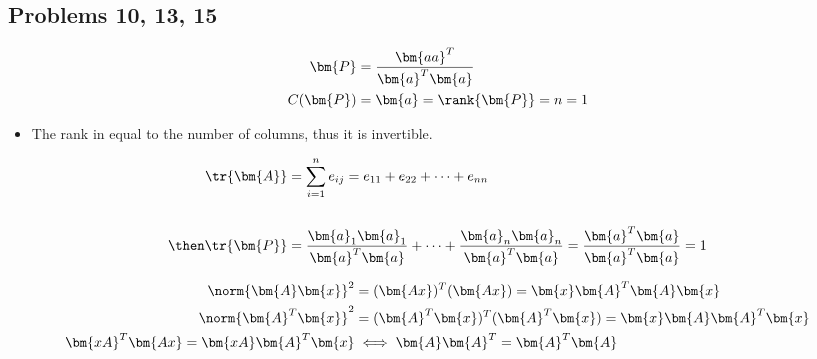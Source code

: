 \begin{itemize}
  \newpage
  \subsection{Problems 10, 13, 15}
  \begin{itemize}
    \begin{align*}
      \bm{P} &= \frac{\bm{aa}^T}{\bm{a}^T \bm{a}} \\
      C(\bm{P}) &= \bm{a} = \rank{\bm{P}} = n = 1
    \end{align*}
    \begin{itemize}
      \item The rank in equal to the number of columns, thus it is invertible.
    \end{itemize}


    \begin{align*}
      \tr{\bm{A}} &= \sum_{i=1}^{n} e_{ij} = e_{11} + e_{22} + \cdots + e_{nn} \\\\
    \then \tr{\bm{P}} &= \frac{\bm{a}_1 \bm{a}_1}{\bm{a}^T \bm{a}}
    +\cdots+
    \frac{\bm{a}_n \bm{a}_n}{\bm{a}^T \bm{a}} =
    \frac{\bm{a}^T  \bm{a}}{\bm{a}^T \bm{a}} = 1 \\
    \end{align*}

    \begin{align*}
      \norm{\bm{A} \bm{x}}^2 &= (\bm{Ax})^T (\bm{Ax}) = \bm{x}\bm{A}^T \bm{A}\bm{x} \\
      \norm{\bm{A}^T  \bm{x}}^2 &= (\bm{A}^T \bm{x})^T (\bm{A}^T \bm{x}) = \bm{x}\bm{A}\bm{A}^T \bm{x}\\
      \bm{xA}^T \bm{Ax} = \bm{xA}\bm{A}^T \bm{x} &\iff \bm{A}\bm{A}^T = \bm{A}^T \bm{A}
    \end{align*}
  \end{itemize}

\end{itemize}

